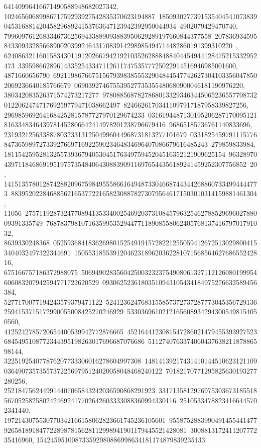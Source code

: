 {{{64140996416671490588948682027342, 1024656068998671759293927542835370623194887\
18509302773915354045410738390453168814204582968924153763647123942392950044934\
4902079429470740, 79960976126833467362569433889093883950629289197660844377558\
20783693459584330933285668900203992464317083914298985494714482860191399310220\
, 624086321160158343011912026679421921035262888488404454944128475215332952473\
33959866289614335254334711261174753577725022914516946985001600, 4871660656790\
69211986766751567939838555329048445477426273041033560478502069236640185766679\
069039274675539527735355480680900046181190976220, 380342083526371574273217277\
97808856878278680133293463445065236557708732012206247471769259779471038662497\
82466261703411097917187958339827256, 2969859692641684252815787727970129674233\
03161944871301952062871700951218163348346439781452806642414978201238796679416\
96865185736761140833696, 2319321256338878032331312504996044968731813277101679\
03318254597911157768473659897273392766971692259023464834696407086679616485243\
279859833984, 181154259528132557393679405304517634975945204516352121909625154\
96328970439711846869195197573548406430883909116976544356189241459252307756852\
20, 1415135780128742882096759849555866164948733046687443442688607334994444773\
8839520228468856216537722165823088782730795646171503010314159881461304, 11056\
27571192873247708941353340025469203731084579632546278852969602788009391335749\
76878379810716359953529447711890855806240576813741679701791032, 8639330248368\
05259368418362698015254919157282212550594126725130298004153404032497322344691\
150553185539120462318962036228107156856462768655242816, 675166757186372988075\
50694902835604250032323754908061327112126080199954606083207942594771722620529\
09306252361803510943105434184975276632589456384, 5277170077194243579379471122\
52412362476831558573727372877730453567291362594153715172990055008425270246929\
53303696102121656089342943005498154050560, 4125242785720654400539942772876665\
45216441230815472860214794553939275236845495108772344395198263017696687076686\
511274076337406043763821187886598144, 322519254077876207733306016278604997308\
14814139217431410144510623121109036490735735573722569795124020058048468240122\
70182170771295825630193277280256, 2521847562449914407065843242036590868291923\
33171358129769753036731855185670525825802424692417702642603333088360994330116\
25105334788234166445702341440, 1972143075530770342166158062823661745236105601\
95587528839904914554414779265818918477228987815628112998941901179445521428081\
300881317241120777235416960, 154245951008733592980886998634181174879839235133\
}}}
